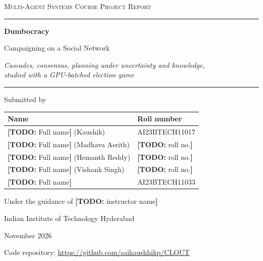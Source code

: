 \documentclass[11pt,a4paper,oneside]{report}
\newcommand{\todo}[1]{\textcolor{todo}{\textbf{[TODO:} #1\textbf{]}}}
\newcommand{\repo}{\url{https://github.com/saikaushhikp/CLOUT}}
\begin{document}
\begin{titlepage}
\centering
\vspace*{1.2cm}
{\large\scshape\color{accent} Multi-Agent Systems \textendash{} Course Project Report\par}
\vspace{1.4cm}
{\color{ink}\rule{\linewidth}{0.8pt}\par}
\vspace{0.5cm}
{\fontsize{30}{36}\selectfont\bfseries\color{ink} Dumbocracy\par}
\vspace{0.35cm}
{\LARGE\color{ink} Campaigning on a Social Network\par}
\vspace{0.4cm}
{\large\itshape Cascades, consensus, planning under uncertainty and knowledge,\\
studied with a GPU-batched election game\par}
\vspace{0.5cm}
{\color{ink}\rule{\linewidth}{0.8pt}\par}
\vspace{1.6cm}

{\large Submitted by\par}
\vspace{0.4cm}
\begin{tabular}{ll}
\toprule
\textbf{Name} & \textbf{Roll number} \\
\midrule
\todo{Full name} (Kaushik) & AI23BTECH11017 \\
\todo{Full name} (Madhava Asrith) & \todo{roll no.} \\
\todo{Full name} (Hemanth Reddy) & \todo{roll no.} \\
\todo{Full name} (Vishank Singh) & \todo{roll no.} \\
\todo{Full name} & AI23BTECH11033 \\
\bottomrule
\end{tabular}

\vspace{1.4cm}
{\large Under the guidance of \todo{instructor name}\par}
\vspace{0.3cm}
{\large Indian Institute of Technology Hyderabad\par}
\vspace{0.3cm}
{\large November 2026\par}
\vfill
{\small Code repository: \repo\par}
\end{titlepage}
\end{document}

